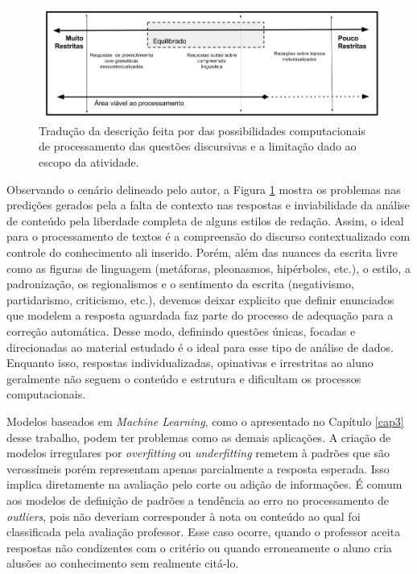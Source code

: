 \begin{figure}[ht]
\centering
\includegraphics[width=.9\textwidth]{img/aprendizadoNLP.png}
\caption{Tradução da descrição feita por  das possibilidades computacionais de processamento das questões discursivas e a limitação dado ao escopo da atividade.}
\label{language-learning}
\end{figure}

Observando o cenário delineado pelo autor, a Figura \ref{language-learning} mostra os problemas nas predições gerados pela a falta de contexto nas respostas e inviabilidade da análise de conteúdo pela liberdade completa de alguns estilos de redação. Assim, o ideal para o processamento de textos é a compreensão do discurso contextualizado com controle do conhecimento ali inserido. Porém, além das nuances da escrita livre como as figuras de linguagem (metáforas, pleonasmos, hipérboles, etc.), o estilo, a padronização, os regionalismos e o sentimento da escrita (negativismo, partidarismo, criticismo, etc.), devemos deixar explicito que definir enunciados que modelem a resposta aguardada faz parte do processo de adequação para a correção automática. Desse modo, definindo questões únicas, focadas e direcionadas ao material estudado é o ideal para esse tipo de análise de dados. Enquanto isso, respostas individualizadas, opinativas e irrestritas ao aluno geralmente não seguem o conteúdo e estrutura e dificultam os processos computacionais. 

Modelos baseados em \textit{Machine Learning}, como o apresentado no Capítulo \ref{cap3} desse trabalho, podem ter problemas como as demais aplicações. A criação de modelos irregulares por \textit{overfitting} ou \textit{underfitting} remetem à padrões que são verossímeis porém representam apenas parcialmente a resposta esperada. Isso implica diretamente na avaliação pelo corte ou adição de informações. É comum aos modelos de definição de padrões a tendência ao erro no processamento de \textit{outliers}, pois não deveriam corresponder à nota ou conteúdo ao qual foi classificada pela avaliação professor. Esse caso ocorre, quando o professor aceita respostas não condizentes com o critério ou quando erroneamente o aluno cria alusões ao conhecimento sem realmente citá-lo.


